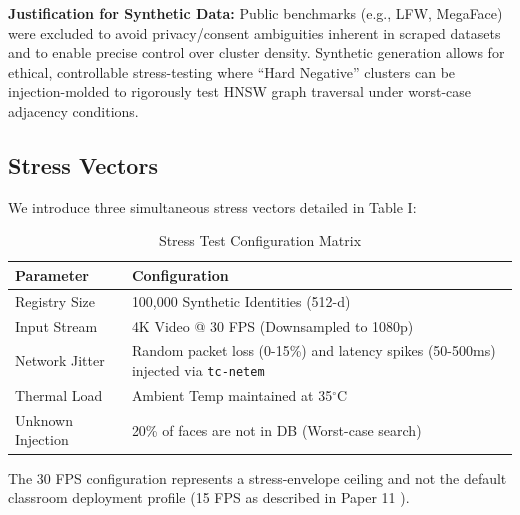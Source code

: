 \documentclass[conference]{IEEEtran}
\begin{document}
\textbf{Justification for Synthetic Data:} Public benchmarks (e.g., LFW, MegaFace) were excluded to avoid privacy/consent ambiguities inherent in scraped datasets and to enable precise control over cluster density. Synthetic generation allows for ethical, controllable stress-testing where ``Hard Negative'' clusters can be injection-molded to rigorously test HNSW graph traversal under worst-case adjacency conditions.

\subsection{Stress Vectors}
We introduce three simultaneous stress vectors detailed in Table I:

\begin{table}[htbp]
\caption{Stress Test Configuration Matrix}
\begin{center}
\begin{tabular}{l p{5cm}}
\toprule
\textbf{Parameter} & \textbf{Configuration} \\
\midrule
Registry Size & 100,000 Synthetic Identities (512-d) \\
Input Stream & 4K Video @ 30 FPS (Downsampled to 1080p) \\
Network Jitter & Random packet loss (0-15\%) and latency spikes (50-500ms) injected via \texttt{tc-netem} \\
Thermal Load & Ambient Temp maintained at 35$^\circ$C \\
Unknown Injection & 20\% of faces are not in DB (Worst-case search) \\
\bottomrule
\end{tabular}
\end{center}
\label{tab:stress}
\end{table}

The 30 FPS configuration represents a stress-envelope ceiling and not the default classroom deployment profile (15 FPS as described in Paper 11 \cite{p11}).
\end{document}
